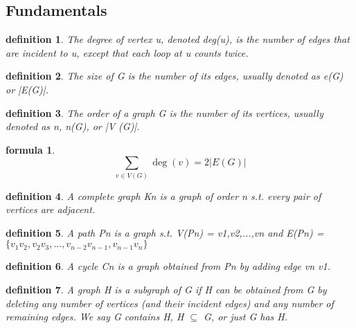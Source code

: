 \documentclass[2pt]{article}
\title{}
\newtheorem{definition}{definition}
\newtheorem{formula}{formula}
\begin{document}
\begin{CJK*}{UTF8}{bkai}


\section*{Fundamentals}
\begin{paracol}{2} %
    \switchcolumn[0]
    \begin{definition}
        The degree of vertex u, denoted deg(u), is the number of edges that are
 incident to u, except that each loop at u counts twice.
    \end{definition}
    
    \begin{definition}
    The size of G is the number of its edges, usually denoted as e(G) or |E(G)|.
    \end{definition}
    
    \begin{definition}
        The order of a graph G is the number of its vertices, usually denoted as n,
 n(G), or |V (G)|.
    \end{definition}
    
    \begin{formula}
    \[
    \sum_{v \in V(G)} \deg(v) = 2 |E(G)|
    \]
    \end{formula}

    \begin{definition}
        A complete graph Kn is a graph of order n s.t. every pair of vertices are
 adjacent.
    \end{definition}

    \begin{definition}
        A path Pn is a graph s.t. V(Pn) = {v1,v2,...,vn} and
 E(Pn) = $\{v_{1}v_{2},v_{2}v_{3},...,v_{n−2}v_{n−1},v_{n−1}v_{n}\}$
    \end{definition}

    \begin{definition}
        A cycle Cn is a graph obtained from Pn by adding edge vn v1.
    \end{definition}

    \begin{definition}
     A graph H is a subgraph of G if H can be obtained from G by deleting any
 number of vertices (and their incident edges) and any number of remaining
 edges. We say G contains H, H $\subseteq$ G, or just G has H.        
    \end{definition}
    

\end{paracol}
\end{CJK*}
\end{document}

